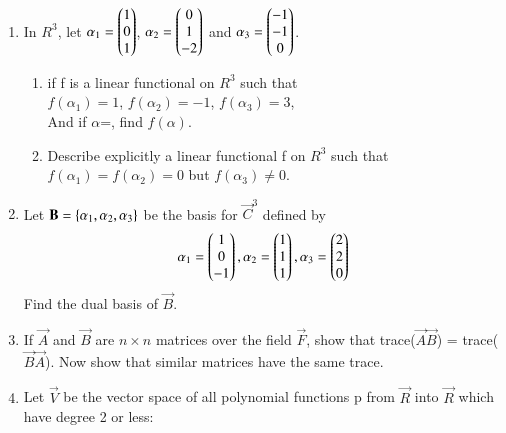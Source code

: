 \renewcommand{\theequation}{\theenumi}
\renewcommand{\thefigure}{\theenumi}
\begin{enumerate}[label=\thesubsection.\arabic*.,ref=\thesubsection.\theenumi]


\item In $R^3$, let $\alpha_1 = \begin{pmatrix}1\\0\\1\end{pmatrix}$, $\alpha_2 =\begin{pmatrix}0\\1\\-2\end{pmatrix}$ and 
$\alpha_3 =\begin{pmatrix}-1\\-1\\0\end{pmatrix}$. 

\begin{enumerate}
\item if f is a linear functional on $R^3$ such that\\ $f(\alpha_1)=1$, $f(\alpha_2)=-1$,  $f(\alpha_3)=3$,\\ And if $\alpha$=, find $f(\alpha)$.
%
\\
\solution

\item Describe explicitly a linear functional f on $R^3$ such that $f(\alpha_1)=f(\alpha_2)=0$ but $f(\alpha_3)\neq 0$.
\\
\solution

\end{enumerate}
%
\item 	Let $\mathbf{B} = \left\{\alpha_1, \alpha_2, \alpha_3\right\}$ be the basis for $\vec{C}^3$ defined by
	\begin{align}
		\alpha_1 = \begin{pmatrix}1\\0\\-1\end{pmatrix}, \alpha_2 = \begin{pmatrix}1\\1\\1\end{pmatrix}, \alpha_3 = \begin{pmatrix}2\\2\\0\end{pmatrix}  
	\end{align}
Find the dual basis of $\vec{B}$.
%
\\
\solution

\item If $\vec{A}$ and $\vec{B}$ are $n\times n$ matrices over the field $\vec{F}$, show that trace($\vec{A}\vec{B}$) = trace($\vec{B}\vec{A}$). Now show that similar matrices have the same trace. 
%
\\
\solution

\item Let $\vec{V}$ be the vector space of all polynomial functions p from $\vec{R}$ into $\vec{R}$ which have degree 2 or less:

\end{enumerate}
